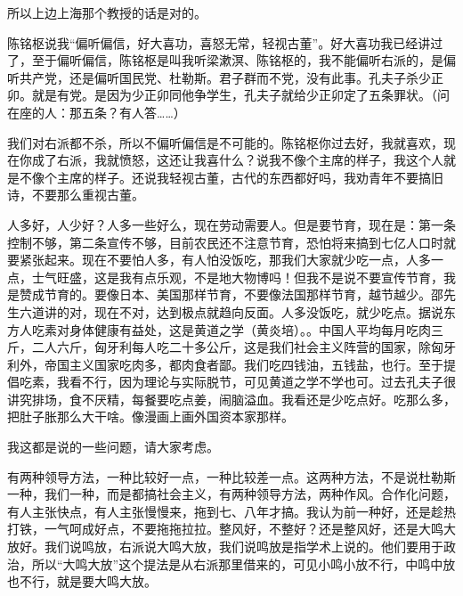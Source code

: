 所以上边上海那个教授的话是对的。

陈铭枢说我“偏听偏信，好大喜功，喜怒无常，轻视古董”。好大喜功我已经讲过了，至于偏听偏信，陈铭枢是叫我听梁漱溟、陈铭枢的，我不能偏听右派的，是偏听共产党，还是偏听国民党、杜勒斯。君子群而不党，没有此事。孔夫子杀少正卯。就是有党。是因为少正卯同他争学生，孔夫子就给少正卯定了五条罪状。（问在座的人：那五条？有人答……）

我们对右派都不杀，所以不偏听偏信是不可能的。陈铭枢你过去好，我就喜欢，现在你成了右派，我就愤怒，这还让我喜什么？说我不像个主席的样子，我这个人就是不像个主席的样子。还说我轻视古董，古代的东西都好吗，我劝青年不要搞旧诗，不要那么重视古董。

人多好，人少好？人多一些好么，现在劳动需要人。但是要节育，现在是：第一条控制不够，第二条宣传不够，目前农民还不注意节育，恐怕将来搞到七亿人口时就要紧张起来。现在不要怕人多，有人怕没饭吃，那我们大家就少吃一点，人多一点，士气旺盛，这是我有点乐观，不是地大物博吗！但我不是说不要宣传节育，我是赞成节育的。要像日本、美国那样节育，不要像法国那样节育，越节越少。邵先生六道讲的对，现在不对，达到极点就趋向反面。人多没饭吃，就少吃点。据说东方人吃素对身体健康有益处，这是黄道之学（黄炎培）。。中国人平均每月吃肉三斤，二人六斤，匈牙利每人吃二十多公斤，这是我们社会主义阵营的国家，除匈牙利外，帝国主义国家吃肉多，都肉食者鄙。我们吃四钱油，五钱盐，也行。至于提倡吃素，我看不行，因为理论与实际脱节，可见黄道之学不学也可。过去孔夫子很讲究排场，食不厌精，每餐要吃点姜，闹脑溢血。我看还是少吃点好。吃那么多，把肚子胀那么大干啥。像漫画上画外国资本家那样。

我这都是说的一些问题，请大家考虑。

有两种领导方法，一种比较好一点，一种比较差一点。这两种方法，不是说杜勒斯一种，我们一种，而是都搞社会主义，有两种领导方法，两种作风。合作化问题，有人主张快点，有人主张慢慢来，拖到七、八年才搞。我认为前一种好，还是趁热打铁，一气呵成好点，不要拖拖拉拉。整风好，不整好？还是整风好，还是大鸣大放好。我们说鸣放，右派说大鸣大放，我们说鸣放是指学术上说的。他们要用于政治，所以“大鸣大放”这个提法是从右派那里借来的，可见小鸣小放不行，中鸣中放也不行，就是要大鸣大放。

